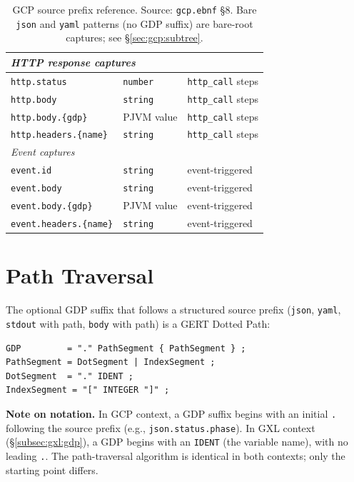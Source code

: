 \begin{table}[ht]
\begin{tabular}{p{5.0cm}p{2.0cm}p{5.0cm}}
\hline
\multicolumn{3}{l}{\textit{HTTP response captures}} \\
\hline
\texttt{http.status}                   & \texttt{number}  & \texttt{http\_call} steps \\
\texttt{http.body}                     & \texttt{string}  & \texttt{http\_call} steps \\
\texttt{http.body.\{gdp\}}             & PJVM value       & \texttt{http\_call} steps \\
\texttt{http.headers.\{name\}}         & \texttt{string}  & \texttt{http\_call} steps \\
\hline
\multicolumn{3}{l}{\textit{Event captures}} \\
\hline
\texttt{event.id}                      & \texttt{string}  & event-triggered \\
\texttt{event.body}                    & \texttt{string}  & event-triggered \\
\texttt{event.body.\{gdp\}}            & PJVM value       & event-triggered \\
\texttt{event.headers.\{name\}}        & \texttt{string}  & event-triggered \\
\hline
\end{tabular}
\caption{GCP source prefix reference.
  Source: \texttt{gcp.ebnf} \S8.
  Bare \texttt{json} and \texttt{yaml} patterns (no GDP suffix) are
  bare-root captures; see \S\ref{sec:gcp:subtree}.}
\label{tab:gcp-sources}
\end{table}

\section{Path Traversal}
\label{sec:gcp:traversal}

The optional GDP suffix that follows a structured source prefix
(\texttt{json}, \texttt{yaml}, \texttt{stdout} with path, \texttt{body}
with path) is a GERT Dotted Path:

\begin{verbatim}
GDP         = "." PathSegment { PathSegment } ;
PathSegment = DotSegment | IndexSegment ;
DotSegment  = "." IDENT ;
IndexSegment = "[" INTEGER "]" ;
\end{verbatim}

\noindent\textbf{Note on notation.}
In GCP context, a GDP suffix begins with an initial \texttt{.} following
the source prefix (e.g., \texttt{json.status.phase}).
In GXL context (\S\ref{subsec:gxl:gdp}), a GDP begins with an
\texttt{IDENT} (the variable name), with no leading \texttt{.}.
The path-traversal algorithm is identical in both contexts; only the
starting point differs.

